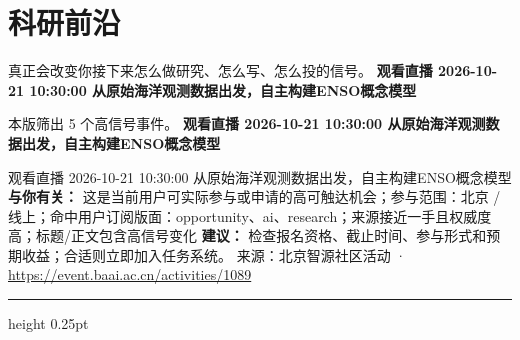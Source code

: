\documentclass[10.5pt]{ctexart}
\begin{document}
\section*{科研前沿}
{\color{ormuted} 真正会改变你接下来怎么做研究、怎么写、怎么投的信号。}
\vspace{2mm}
{\LARGE\bfseries 观看直播 2026-10-21 10:30:00 从原始海‮观洋‬测数据出发，自主构建ENSO概念模型}\par
\vspace{1mm}
{\color{ormuted} 本版筛出 5 个高信号事件。}
\vspace{3mm}
{\Large\bfseries 观看直播 2026-10-21 10:30:00 从原始海‮观洋‬测数据出发，自主构建ENSO概念模型}\par
观看直播 2026-10-21 10:30:00 从原始海‮观洋‬测数据出发，自主构建ENSO概念模型
\textbf{与你有关：} 这是当前用户可实际参与或申请的高可触达机会；参与范围：北京 / 线上；命中用户订阅版面：opportunity、ai、research；来源接近一手且权威度高；标题/正文包含高信号变化
\textbf{建议：} 检查报名资格、截止时间、参与形式和预期收益；合适则立即加入任务系统。
{\footnotesize\color{ormuted} 来源：北京智源社区活动 · \url{https://event.baai.ac.cn/activities/1089}}
\vspace{4mm}
\hrule height 0.25pt
\vspace{3mm}
\end{document}
